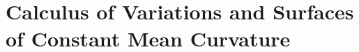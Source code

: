 \documentclass[Shifrin_Solutions_Spring_2018]{subfiles}
\begin{document}
\section{Calculus of Variations and Surfaces of Constant Mean Curvature}

\begin{exercise}

\end{exercise}

\begin{exercise}

\end{exercise}

\begin{exercise}

\end{exercise}


\begin{exercise}

\end{exercise}


\begin{exercise}

\end{exercise}


\begin{exercise}

\end{exercise}


\begin{exercise}

\end{exercise}


\begin{exercise}

\end{exercise}


\begin{exercise}

\end{exercise}
\end{document}
